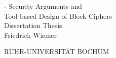 %
%
%

\thispagestyle{empty}
{
    \calccentering{\unitlength}
    \begin{adjustwidth*}{\unitlength}{-\unitlength}
        \raggedleft{}
        {\Huge\color{Burgundy}%
        Security Arguments and\\
        Tool-based Design of Block Ciphers}\\[\baselineskip]
        {\LARGE%
        Dissertation Thesis}\\[0.2\textheight]
        {\huge%
        Friedrich Wiemer}\par
        \vfill
        {%
        \LARGE%
        RUHR-UNIVERSITÄT BOCHUM}
        \vspace*{\baselineskip}
    \end{adjustwidth*}
}

\clearpage{}

\cleardoublepage{}

